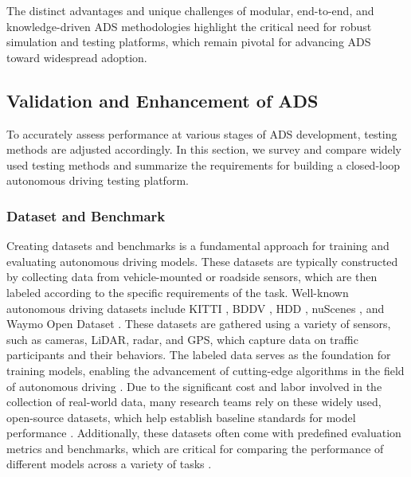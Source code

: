 The distinct advantages and unique challenges of modular, end-to-end, and knowledge-driven ADS methodologies highlight the critical need for robust simulation and testing platforms, which remain pivotal for advancing ADS toward widespread adoption.

\subsection{Validation and Enhancement of ADS}

To accurately assess performance at various stages of ADS development, testing methods are adjusted accordingly. In this section, we survey and compare widely used testing methods and summarize the requirements for building a closed-loop autonomous driving testing platform.

\subsubsection{Dataset and Benchmark}


Creating datasets and benchmarks is a fundamental approach for training and evaluating autonomous driving models. These datasets are typically constructed by collecting data from vehicle-mounted or roadside sensors, which are then labeled according to the specific requirements of the task. Well-known autonomous driving datasets include KITTI \citep{geiger2013vision}, BDDV \citep{xu2017end}, HDD \citep{ramanishka2018toward}, nuScenes \citep{caesar2020nuscenes}, and Waymo Open Dataset \citep{sun2020scalability}. These datasets are gathered using a variety of sensors, such as cameras, LiDAR, radar, and GPS, which capture data on traffic participants and their behaviors. The labeled data serves as the foundation for training models, enabling the advancement of cutting-edge algorithms in the field of autonomous driving \citep{li2024ego,wang2024driving,zheng2025genad}. Due to the significant cost and labor involved in the collection of real-world data, many research teams rely on these widely used, open-source datasets, which help establish baseline standards for model performance \citep{feng2020deep,liu2024survey}. Additionally, these datasets often come with predefined evaluation metrics and benchmarks, which are critical for comparing the performance of different models across a variety of tasks \citep{guo2019safe}.

